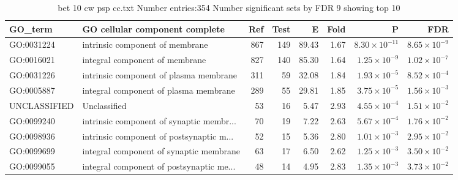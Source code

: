 \begin{table}[ht]
\centering
\begin{adjustbox}{width=\textwidth}
\begin{tabular}{llrrrrrr}
  \hline
GO\_term & GO cellular component complete & Ref & Test & E & Fold & P & FDR \\ 
  \hline
GO:0031224 & intrinsic component of membrane  & 867 & 149 & 89.43 & 1.67 & $8.30 \times 10^{-11}$ & $8.65 \times 10^{-9}$ \\ 
  GO:0016021 & integral component of membrane  & 827 & 140 & 85.30 & 1.64 & $1.25 \times 10^{-9}$ & $1.02 \times 10^{-7}$ \\ 
  GO:0031226 & intrinsic component of plasma membrane  & 311 & 59 & 32.08 & 1.84 & $1.93 \times 10^{-5}$ & $8.52 \times 10^{-4}$ \\ 
  GO:0005887 & integral component of plasma membrane  & 289 & 55 & 29.81 & 1.85 & $3.75 \times 10^{-5}$ & $1.56 \times 10^{-3}$ \\ 
  UNCLASSIFIED & Unclassified  & 53 & 16 & 5.47 & 2.93 & $4.55 \times 10^{-4}$ & $1.51 \times 10^{-2}$ \\ 
  GO:0099240 & intrinsic component of synaptic membr... & 70 & 19 & 7.22 & 2.63 & $5.67 \times 10^{-4}$ & $1.76 \times 10^{-2}$ \\ 
  GO:0098936 & intrinsic component of postsynaptic m... & 52 & 15 & 5.36 & 2.80 & $1.01 \times 10^{-3}$ & $2.95 \times 10^{-2}$ \\ 
  GO:0099699 & integral component of synaptic membrane  & 63 & 17 & 6.50 & 2.62 & $1.25 \times 10^{-3}$ & $3.50 \times 10^{-2}$ \\ 
  GO:0099055 & integral component of postsynaptic me... & 48 & 14 & 4.95 & 2.83 & $1.35 \times 10^{-3}$ & $3.73 \times 10^{-2}$ \\ 
  \hline
\end{tabular}
\end{adjustbox}
\caption{bet 10 cw psp cc.txt Number entries:354 Number significant sets by FDR 9 showing top 10} 
\label{tab:bet 10 cw psp cc.txt Number entries:354 Number significant sets by FDR 9 showing top 10}
\end{table}


